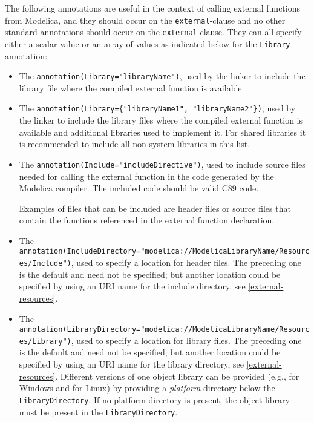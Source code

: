 The following annotations are useful in the context of calling external functions from Modelica, and they should occur on the {\lstinline!external!}-clause and no other standard annotations should occur on the {\lstinline!external!}-clause.
They can all specify either a scalar value or an array of values as indicated below for the {\lstinline!Library!} annotation:
\begin{itemize}
\item
  The {\lstinline!annotation(Library="libraryName")!}, used by the linker to include the library file where the compiled external function is available.
\item
  The {\lstinline!annotation(Library={"libraryName1", "libraryName2"})!}, used by the linker to include the library files where the compiled external function is available and additional libraries used to implement it.
  For shared libraries it is recommended to include all non-system libraries in this list.
\item
  The {\lstinline!annotation(Include="includeDirective")!}, used to include source files needed for calling the external function in the code generated by the Modelica compiler.
  The included code should be valid C89 code.
  \begin{nonnormative}
  Examples of files that can be included are header files or source files that contain the functions referenced in the external function declaration.
  \end{nonnormative}
\item
  The
  {\lstinline!annotation(IncludeDirectory="modelica://ModelicaLibraryName/Resources/Include")!}, used to specify a location for header files.
  The preceding one is the default and need not be specified; but another location could be specified by using an URI name for the include directory, see \cref{external-resources}.
\item
  The
  {\lstinline!annotation(LibraryDirectory="modelica://ModelicaLibraryName/Resources/Library")!}, used to specify a location for library files.
  The preceding one is the default and need not be specified; but another location could be specified by using an URI name for the library directory, see \cref{external-resources}.
  Different versions of one object library can be provided (e.g., for Windows and for Linux) by providing a \emph{platform} directory below the {\lstinline!LibraryDirectory!}.
  If no platform directory is present, the object library must be present in the {\lstinline!LibraryDirectory!}.

\end{itemize}
